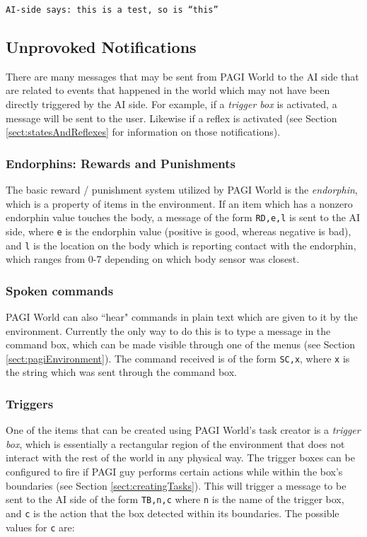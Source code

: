 \texttt{AI-side says: this is a test, so is ``this''}

\subsection{Unprovoked Notifications}

There are many messages that may be sent from PAGI World to the AI side that are related to events that happened in the world which may not have been directly triggered by the AI side. For example, if a \textit{trigger box} is activated, a message will be sent to the user. Likewise if a reflex is activated (see Section \ref{sect:statesAndReflexes} for information on those notifications).

\subsubsection{Endorphins: Rewards and Punishments}

The basic reward / punishment system utilized by PAGI World is the \textit{endorphin}, which is a property of items in the environment. If an item which has a nonzero endorphin value touches the body, a message of the form \texttt{RD,e,l} is sent to the AI side, where \texttt{e} is the endorphin value (positive is good, whereas negative is bad), and \texttt{l} is the location on the body which is reporting contact with the endorphin, which ranges from 0-7 depending on which body sensor was closest.

\subsubsection{Spoken commands}

PAGI World can also ``hear" commands in plain text which are given to it by the environment. Currently the only way to do this is to type a message in the command box, which can be made visible through one of the menus (see Section \ref{sect:pagiEnvironment}). The command received is of the form \texttt{SC,x}, where \texttt{x} is the string which was sent through the command box.

\subsubsection{Triggers}

One of the items that can be created using PAGI World's task creator is a \textit{trigger box}, which is essentially a rectangular region of the environment that does not interact with the rest of the world in any physical way. The trigger boxes can be configured to fire if PAGI guy performs certain actions while within the box's boundaries (see Section \ref{sect:creatingTasks}). This will trigger a message to be sent to the AI side of the form \texttt{TB,n,c} where \texttt{n} is the name of the trigger box, and \texttt{c} is the action that the box detected within its boundaries. The possible values for \texttt{c} are:

